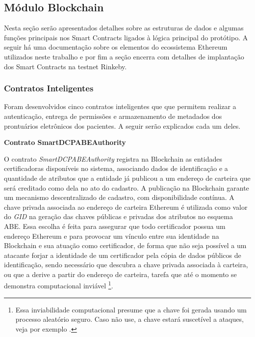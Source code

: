 \documentclass[a4paper,11pt]{article}
\begin{document}
\subsection{Módulo Blockchain}

Nesta seção serão apresentados detalhes sobre as estruturas de dados e algumas funções principais nos Smart Contracts ligados à lógica principal do protótipo.
A seguir há uma documentação sobre os elementos do ecossistema Ethereum utilizados neste trabalho e por fim a seção encerra com detalhes de implantação dos Smart Contracts na testnet Rinkeby.

\subsubsection{Contratos Inteligentes}
\label{sec:sub:ImplementacaoSmartContracts}

Foram desenvolvidos cinco contratos inteligentes que que permitem realizar a autenticação, entrega de permissões e armazenamento de metadados dos prontuários eletrônicos dos pacientes.
A seguir serão explicados cada um deles.

\textbf{Contrato SmartDCPABEAuthority}



O contrato \emph{SmartDCPABEAuthority} registra na Blockchain as entidades certificadoras disponíveis no sistema, associando dados de identificação e a quantidade de atributos que a entidade já publicou a um endereço de carteira que será creditado como dela no ato do cadastro.
A publicação na Blockchain garante um mecanismo descentralizado de cadastro, com disponibilidade contínua.
A chave privada associada ao endereço de carteira Ethereum é utilizada como valor do \emph{GID} na geração das chaves públicas e privadas dos atributos no esquema ABE.
Essa escolha é feita para assegurar que todo certificador possua um endereço Ethereum e para provocar um vínculo entre sua identidade na Blockchain e sua atuação como certificador, de forma que não seja possível a um atacante forjar a identidade de um certificador pela cópia de dados públicos de identificação, sendo necessário que descubra a chave privada associada à carteira, ou que a derive a partir do endereço de carteira, tarefa que até o momento se demonstra computacional inviável
\footnote{Essa inviabilidade computacional presume que a chave foi gerada usando um processo aleatório seguro. Caso não use, a chave estará suscetível a ataques, veja por exemplo \cite{Bednarek2019}.}.
\end{document}
